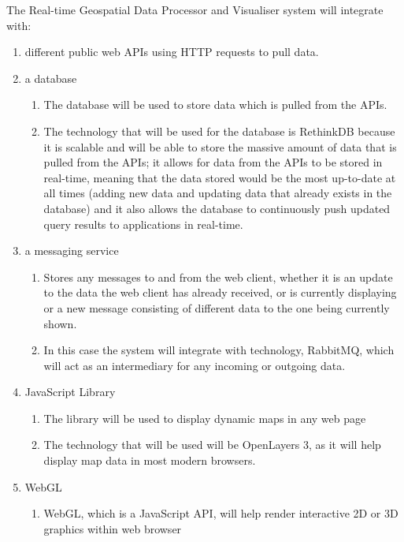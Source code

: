 The Real-time Geospatial Data Processor and Visualiser system will integrate with:
	\begin{enumerate}
		\item different public web APIs using HTTP requests to pull data.
		\item a database
			\begin{enumerate}
				\item The database will be used to store data which is pulled from the APIs.
				\item The technology that will be used for the database is RethinkDB because it is scalable and will be able to store the massive amount of data that is pulled from the APIs; it allows for data from the APIs to be stored in real-time, meaning that the data stored would be the most up-to-date at all times (adding new data and updating data that already exists in the database) and it also allows the database to continuously push updated query results to applications in real-time. 
			\end{enumerate}
		\item a messaging service
			\begin{enumerate}
				\item Stores any messages to and from the web client, whether it is an update to the data the web client has already received, or is currently displaying or a new message consisting of different data to the one being currently shown.
				\item In this case the system will integrate with technology, RabbitMQ, which will act as an intermediary for any incoming or outgoing data. 
			\end{enumerate}
		\item JavaScript Library
			\begin{enumerate}
				\item The library will be used to display dynamic maps in any web page
				\item The technology that will be used will be OpenLayers 3, as it will help display map data in most modern browsers.
			\end{enumerate}
		\item WebGL
			\begin{enumerate}
				\item WebGL, which is a JavaScript API, will help render interactive 2D or 3D graphics within web browser
			\end{enumerate}
	\end{enumerate}